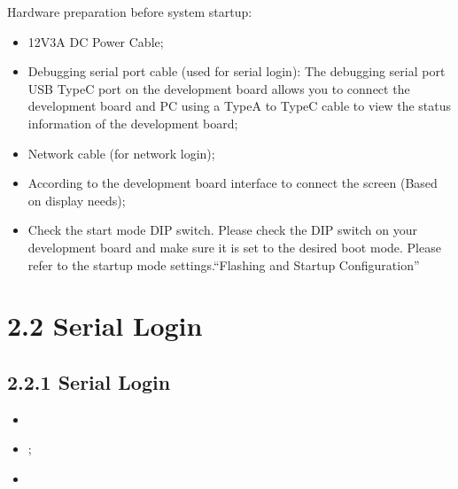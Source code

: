 \documentclass[letterpaper,10pt,openany,english]{sphinxmanual}
\begin{document}
\sphinxAtStartPar
Hardware preparation before system startup:
\begin{itemize}
\item {} 
\sphinxAtStartPar
12V3A DC Power Cable;

\item {} 
\sphinxAtStartPar
Debugging serial port cable (used for serial login): The debugging serial port USB Type\sphinxhyphen{}C port on the development board allows you to connect the development board and PC using a Type\sphinxhyphen{}A to Type\sphinxhyphen{}C cable to view the status information of the development board;

\item {} 
\sphinxAtStartPar
Network cable (for network login);

\item {} 
\sphinxAtStartPar
According to the development board interface to connect the screen (Based on display needs);

\item {} 
\sphinxAtStartPar
Check the start mode DIP switch. Please check the DIP switch on your development board and make sure it is set to the desired boot mode. Please refer to the startup mode settings.“Flashing and Startup Configuration”

\end{itemize}

\sphinxAtStartPar
{}


\section{2.2 Serial Login}
\label{\detokenize{linux-manual:serial-login}}

\subsection{2.2.1 Serial Login}
\label{\detokenize{linux-manual:id1}}
\sphinxAtStartPar
{}
\begin{itemize}
\item {} 
\sphinxAtStartPar
{}

\item {} 
\sphinxAtStartPar
{};

\item {} 
\sphinxAtStartPar
{}

\end{itemize}
\end{document}
